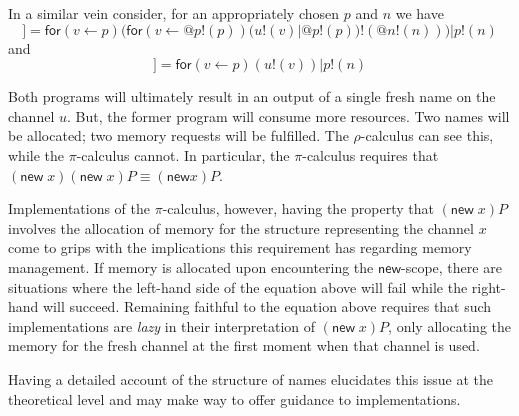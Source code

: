 \documentclass{llncs}
\makeatletter
\newcommand{\pic}{$\pi$-calculus}
\newcommand{\ldb}{[\![}
\newcommand{\rdb}{]\!]}
\newcommand{\quotep}[1]{\mathsf{@}#1}
\newcommand{\meaningof}[1]{\ldb #1 \rdb}
\newcommand{\rhoc}{$\rho$-calculus}
\makeatother
\begin{document}
\begin{example}
	In a similar vein consider, for an appropriately chosen $p$ and $n$ we have
	\begin{equation*}
		\meaningof{(\mathsf{new}\;v)(\mathsf{new}\;v) u!(v)} = \mathsf{for}(v \leftarrow p)(\mathsf{for}({v} \leftarrow {\quotep{p!(p)}})(u!(v)|\quotep{p!(p)})!(\quotep{n!(n)})) | p!(n)
	\end{equation*}
	and
	\begin{equation*}
		\meaningof{(\mathsf{new}\;v)u!(v)} = \mathsf{for}(v \leftarrow p)(u!(v) )|p!(n)
	\end{equation*}

	Both programs will ultimately result in an output of a single
	fresh name on the channel $u$. But, the former program will
	consume more resources. Two names will be allocated; two memory
	requests will be fulfilled. The {\rhoc} can see this, while the
	{\pic} cannot. In particular, the {\pic} requires that
	$(\mathsf{new}\;x)(\mathsf{new}\;x)P \equiv (\mathsf{new} x)P$.

	Implementations of the {\pic}, however, having the property that
	$(\mathsf{new}\;x)P$ involves the allocation of memory for the
	structure representing the channel $x$ come to grips with the
	implications this requirement has regarding memory management. If
	memory is allocated upon encountering the $\mathsf{new}$-scope, there are
	situations where the left-hand side of the equation above will
	fail while the right-hand will succeed. Remaining faithful to the
	equation above requires that such implementations are
	\textit{lazy} in their interpretation of $(\mathsf{new}\;x)P$, only
	allocating the memory for the fresh channel at the first moment
	when that channel is used.

	Having a detailed account of the structure of names elucidates
	this issue at the theoretical level and may make way to offer
	guidance to implementations.
\end{example}
\end{document}
